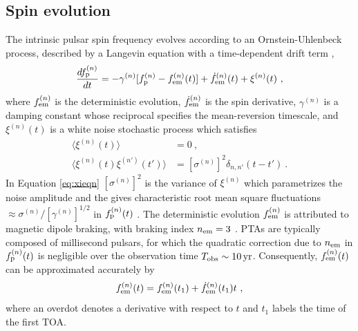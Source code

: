 \documentclass[fleqn,usenatbib,useAMS]{mnras}
\begin{document}
\subsection{Spin evolution} \label{sec:psr_frequency}
The intrinsic pulsar spin frequency evolves according to an Ornstein-Uhlenbeck process, described by a Langevin equation with a time-dependent drift term \citep{Vargas},
\begin{equation}
	\frac{df_{\rm p}^{(n)}}{dt} = -\gamma^{(n)}	 [f_{\rm p}^{(n)} - f_{\rm em}^{(n)} (t)] + \dot{f}_{\rm em}^{(n)}(t) +\xi^{(n)}(t) \ , 
	\label{eq:frequency_evolution}
\end{equation}
where $f_{\rm em}^{(n)}$ is the deterministic evolution, $\dot{f}_{\rm em}^{(n)}$ is the spin derivative, $\gamma^{(n)}$ is a damping constant whose reciprocal specifies the mean-reversion timescale, and $\xi^{(n)}(t)$ is a white noise stochastic process which satisfies
\begin{align}
	\langle \xi^{(n)}(t) \rangle &= 0 \ , \\
	\langle \xi^{(n)}(t) \xi^{(n')}(t') \rangle &= [\sigma^{(n)}]^2 \delta_{n,n'}(t - t') \ .	\label{eq:xieqn}
\end{align}
In Equation \eqref{eq:xieqn} $[\sigma^{(n)}]^2$ is the variance of $\xi^{(n)}$ which parametrizes the noise amplitude and the gives characteristic root mean square fluctuations $\approx \sigma^{(n)} / [\gamma^{(n)}]^{1/2}$ in $f_{\rm p}^{(n)}(t)$ \citep{gardiner2009stochastic}. The deterministic evolution $f_{\rm em}^{(n)}$ is attributed to magnetic dipole braking, with braking index $n_{\rm em}=3$ \citep{1969ApJ...157..869G}. PTAs are typically composed of millisecond pulsars, for which the quadratic correction due to $n_{\rm em}$ in $f_{\rm p}^{(n)}(t)$ is negligible over the observation time $T_{\rm obs} \sim 10 \, {\rm yr}$. Consequently, 	$f_{\rm em}^{(n)}(t)$ can be approximated accurately by 
\begin{equation}
	f_{\rm em}^{(n)}(t) = f_{\rm em}^{(n)}(t_1) + \dot{f}_{\rm em}^{(n)}(t_1)t \ , \label{eq:spinevol}
\end{equation} 
where an overdot denotes a derivative with respect to $t$ and $t_1$ labels the time of the first TOA. \newline 
\end{document}
